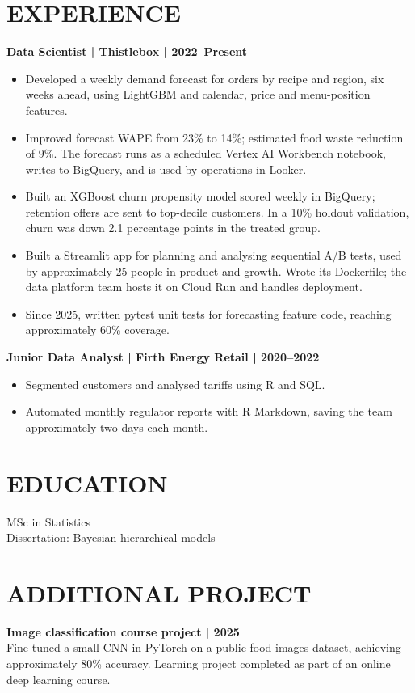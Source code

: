 \documentclass[11pt,a4paper]{article}
\begin{document}
\section*{EXPERIENCE}
\textbf{Data Scientist | Thistlebox | 2022–Present}
\begin{itemize}
\item Developed a weekly demand forecast for orders by recipe and region, six weeks ahead, using LightGBM and calendar, price and menu-position features.
\item Improved forecast WAPE from 23\% to 14\%; estimated food waste reduction of 9\%. The forecast runs as a scheduled Vertex AI Workbench notebook, writes to BigQuery, and is used by operations in Looker.
\item Built an XGBoost churn propensity model scored weekly in BigQuery; retention offers are sent to top-decile customers. In a 10\% holdout validation, churn was down 2.1 percentage points in the treated group.
\item Built a Streamlit app for planning and analysing sequential A/B tests, used by approximately 25 people in product and growth. Wrote its Dockerfile; the data platform team hosts it on Cloud Run and handles deployment.
\item Since 2025, written pytest unit tests for forecasting feature code, reaching approximately 60\% coverage.
\end{itemize}

\textbf{Junior Data Analyst | Firth Energy Retail | 2020–2022}
\begin{itemize}
\item Segmented customers and analysed tariffs using R and SQL.
\item Automated monthly regulator reports with R Markdown, saving the team approximately two days each month.
\end{itemize}

\section*{EDUCATION}
MSc in Statistics\\
Dissertation: Bayesian hierarchical models

\section*{ADDITIONAL PROJECT}
\textbf{Image classification course project | 2025}\\
Fine-tuned a small CNN in PyTorch on a public food images dataset, achieving approximately 80\% accuracy. Learning project completed as part of an online deep learning course.
\end{document}
